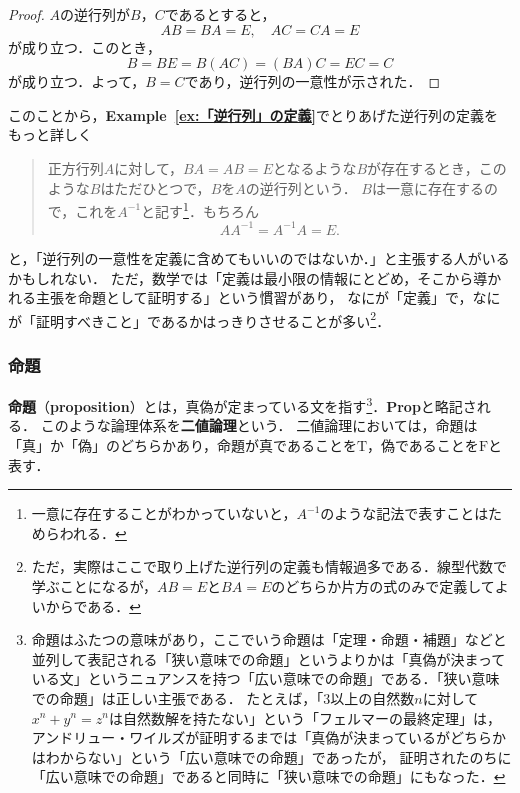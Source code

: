 \documentclass[a4paper,11pt]{ltjsarticle}
\renewcommand{\emph}[1]{\textbf{#1}}
\newenvironment{tleftbar}{\begin{tbleftline}\setlength{\parindent}{1\zw}}{\end{tbleftline}}
\newcommand{\exref}[1]{\textsf{\bfseries Example~\ref{ex:#1}}}
\begin{document}
\begin{tleftbar}
  \begin{proof}
    $A$の逆行列が$B$，$C$であるとすると，
    \[
      AB=BA=E,\quad AC=CA=E
    \]
    が成り立つ．このとき，
    \[
      B=BE=B(AC)=(BA)C=EC=C
    \]
    が成り立つ．よって，$B=C$であり，逆行列の一意性が示された．
  \end{proof}
\end{tleftbar}

このことから，\exref{「逆行列」の定義}でとりあげた逆行列の定義をもっと詳しく

\begin{quote}
  正方行列$A$に対して，$BA = AB =E$となるような$B$が存在するとき，このような$B$はただひとつで，$B$を$A$の逆行列という．
  $B$は一意に存在するので，これを$A^{-1}$と記す\footnote{一意に存在することがわかっていないと，$A^{-1}$のような記法で表すことはためらわれる．}．もちろん
  \[
    AA^{-1}=A^{-1}A=E.
  \]
\end{quote}
と，「逆行列の一意性を定義に含めてもいいのではないか．」と主張する人がいるかもしれない．
ただ，数学では「定義は最小限の情報にとどめ，そこから導かれる主張を命題として証明する」という慣習があり，
なにが「定義」で，なにが「証明すべきこと」であるかはっきりさせることが多い\footnote{ただ，実際はここで取り上げた逆行列の定義も情報過多である．線型代数で学ぶことになるが，$AB=E$と$BA=E$のどちらか片方の式のみで定義してよいからである．}．

\subsubsection{命題}

\emph{命題}（\emph{proposition}）とは，真偽が定まっている文を指す\footnote{命題はふたつの意味があり，ここでいう命題は「定理・命題・補題」などと並列して表記される「狭い意味での命題」というよりかは「真偽が決まっている文」というニュアンスを持つ「広い意味での命題」である．「狭い意味での命題」は正しい主張である．
  たとえば，「$3$以上の自然数$n$に対して$x^n + y^n =z^n$は自然数解を持たない」という「フェルマーの最終定理」は，
  アンドリュー・ワイルズが証明するまでは「真偽が決まっているがどちらかはわからない」という「広い意味での命題」であったが，
  証明されたのちに「広い意味での命題」であると同時に「狭い意味での命題」にもなった．}．\textbf{Prop}と略記される．
このような論理体系を\emph{二値論理}という．
二値論理においては，命題は「真」か「偽」のどちらかあり，命題が真であることを$\mathrm{T}$，偽であることを$\mathrm{F}$と表す．
\end{document}
